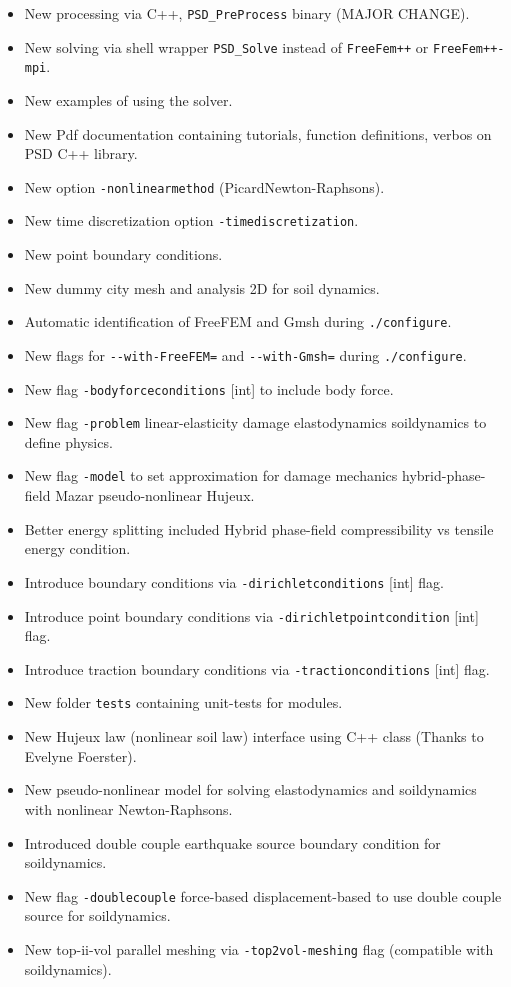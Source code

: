 \begin{itemize}
\tightlist
\item
  New processing via C++, \lstinline!PSD_PreProcess! binary (MAJOR
  CHANGE).
\item
  New solving via shell wrapper \lstinline!PSD_Solve! instead of
  \lstinline!FreeFem++! or \lstinline!FreeFem++-mpi!.
\item
  New examples of using the solver.
\item
  New Pdf documentation containing tutorials, function definitions,
  verbos on PSD C++ library.
\item
  New option \lstinline!-nonlinearmethod!
  (Picard\textbar{}Newton-Raphsons).
\item
  New time discretization option \lstinline!-timediscretization!.
\item
  New point boundary conditions.
\item
  New dummy city mesh and analysis 2D for soil dynamics.
\item
  Automatic identification of FreeFEM and Gmsh during
  \lstinline!./configure!.
\item
  New flags for \lstinline!--with-FreeFEM=! and \lstinline!--with-Gmsh=!
  during \lstinline!./configure!.
\item
  New flag \lstinline!-bodyforceconditions! {[}int{]} to include body
  force.
\item
  New flag \lstinline!-problem! linear-elasticity \textbar{} damage
  \textbar{} elastodynamics \textbar{} soildynamics to define physics.
\item
  New flag \lstinline!-model! to set approximation for damage mechanics
  hybrid-phase-field \textbar{} Mazar \textbar{} pseudo-nonlinear
  \textbar{} Hujeux.
\item
  Better energy splitting included Hybrid phase-field compressibility vs
  tensile energy condition.
\item
  Introduce boundary conditions via \lstinline!-dirichletconditions!
  {[}int{]} flag.
\item
  Introduce point boundary conditions via
  \lstinline!-dirichletpointcondition! {[}int{]} flag.
\item
  Introduce traction boundary conditions via
  \lstinline!-tractionconditions! {[}int{]} flag.
\item
  New folder \lstinline!tests! containing unit-tests for modules.
\item
  New Hujeux law (nonlinear soil law) interface using C++ class (Thanks
  to Evelyne Foerster).
\item
  New pseudo-nonlinear model for solving elastodynamics and soildynamics
  with nonlinear Newton-Raphsons.
\item
  Introduced double couple earthquake source boundary condition for
  soildynamics.
\item
  New flag \lstinline!-doublecouple! force-based \textbar{}
  displacement-based to use double couple source for soildynamics.
\item
  New top-ii-vol parallel meshing via \lstinline!-top2vol-meshing! flag
  (compatible with soildynamics).
\end{itemize}

